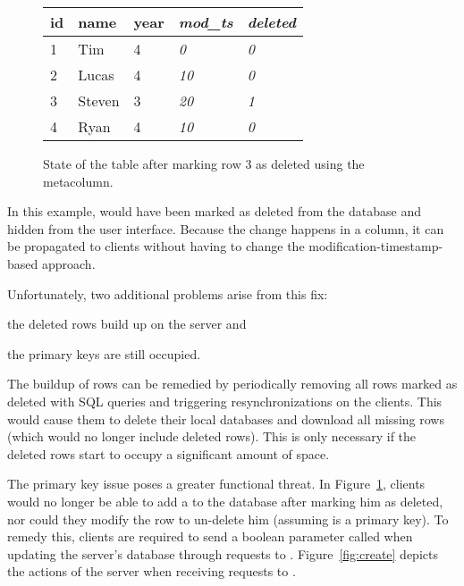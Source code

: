 \begin{figure}[h!]
\center
\begin{tabular}{ l  l  l  l  l}
id  & name      & year  & \textit{mod\_ts} & \textit{deleted} \\ 
\hline
1   & Tim   & 4     & \textit{0}   & \textit{0}     \\
2   & Lucas     & 4     & \textit{10}   & \textit{0}     \\
3   & Steven    & 3     & \textit{20}   & \textit{1}     \\
4   & Ryan      & 4     & \textit{10}   & \textit{0}     \\
\end{tabular}
\caption{State of the  table after marking row 3 as deleted using
the  metacolumn.}
\label{fig:new_deleted}
\end{figure}

In this example,  would have been marked as deleted from the
database and hidden from the user interface. Because the change happens in a
column, it can be propagated to clients without having to change the
modification-timestamp-based approach.

Unfortunately, two additional problems arise from this fix: 
\begin{inparaenum}
\item the deleted rows build up on the server and
\item the primary keys are still occupied. 
\end{inparaenum}
The buildup of rows can be remedied by periodically removing all rows marked as
deleted with SQL  queries and triggering resynchronizations on the
clients. This would cause them to delete their local databases and download all
missing rows (which would no longer include deleted rows). This is only
necessary if the deleted rows start to occupy a significant amount of space.

The primary key issue poses a greater functional threat. In Figure~\ref{fig:new_deleted}, clients
would no longer be able to add a  to the database after marking
him as deleted, nor could they modify the row to un-delete him (assuming
 is a primary key). To remedy this, clients are required to send a
boolean parameter called  when updating the server's
database through requests to \create. Figure~\ref{fig:create} depicts
the actions of the server when receiving requests to \create.


